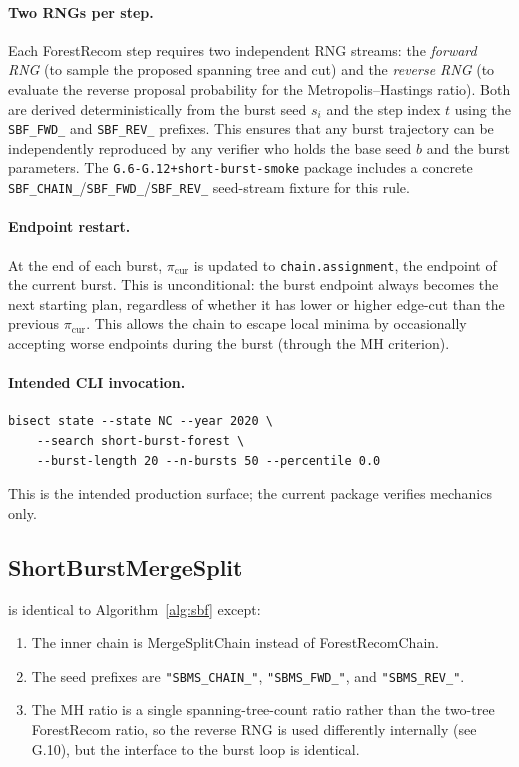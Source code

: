 \paragraph{Two RNGs per step.}
Each ForestRecom step requires two independent RNG streams:
the \emph{forward RNG} (to sample the proposed spanning tree and cut)
and the \emph{reverse RNG} (to evaluate the reverse proposal probability for
the Metropolis--Hastings ratio).
Both are derived deterministically from the burst seed $s_i$ and the
step index $t$ using the \texttt{SBF\_FWD\_} and \texttt{SBF\_REV\_}
prefixes.
This ensures that any burst trajectory can be independently reproduced by
any verifier who holds the base seed $b$ and the burst parameters.
The \texttt{G.6-G.12+short-burst-smoke} package includes a concrete
\texttt{SBF\_CHAIN\_}/\texttt{SBF\_FWD\_}/\texttt{SBF\_REV\_} seed-stream
fixture for this rule.

\paragraph{Endpoint restart.}
At the end of each burst, $\pi_{\mathrm{cur}}$ is updated to
\texttt{chain.assignment}, the endpoint of the current burst.
This is unconditional: the burst endpoint always becomes the next starting
plan, regardless of whether it has lower or higher edge-cut than the
previous $\pi_{\mathrm{cur}}$.
This allows the chain to escape local minima by occasionally accepting
worse endpoints during the burst (through the MH criterion).

\paragraph{Intended CLI invocation.}
\begin{verbatim}
bisect state --state NC --year 2020 \
    --search short-burst-forest \
    --burst-length 20 --n-bursts 50 --percentile 0.0
\end{verbatim}
This is the intended production surface; the current package verifies mechanics
only.

\subsection{ShortBurstMergeSplit}
\label{subsec:alg-sbms}

\sbms{} is identical to Algorithm~\ref{alg:sbf} except:
\begin{enumerate}
  \item The inner chain is MergeSplitChain instead of ForestRecomChain.
  \item The seed prefixes are \texttt{"SBMS\_CHAIN\_"}, \texttt{"SBMS\_FWD\_"},
        and \texttt{"SBMS\_REV\_"}.
  \item The MH ratio is a single spanning-tree-count ratio rather than the
        two-tree ForestRecom ratio, so the reverse RNG is used differently
        internally (see G.10), but the interface to the burst loop is
        identical.
\end{enumerate}

